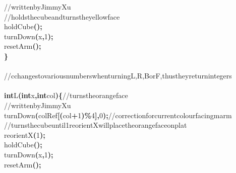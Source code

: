 \documentclass[a4paper, 10pt]{article}
\newcommand\SPC{\hspace*{0.6em}}
\newcommand\TAB{\hspace*{1.2em}}
\newcommand{\CppAComment}[1]{\textcolor[rgb]{0,0.5,0}{\colorbox[rgb]{1,1,1}{#1}}}
\newcommand{\CppAIdentifier}[1]{#1}
\newcommand{\CppANumber}[1]{\textcolor[rgb]{0,0,1}{\colorbox[rgb]{1,1,1}{#1}}}
\newcommand{\CppAReservedWord}[1]{\textbf{\colorbox[rgb]{1,1,1}{#1}}}
\newcommand{\CppASpace}[1]{\colorbox[rgb]{1,1,1}{#1}}
\newcommand{\CppASymbol}[1]{\textbf{\textcolor[rgb]{1,0,0}{\colorbox[rgb]{1,1,1}{#1}}}}
\begin{document}
\begin{ttfamily}
\CppASpace{\TAB }\CppAComment{//\SPC written\SPC by\SPC Jimmy\SPC Xu}\\
\CppASpace{\TAB }\CppAComment{//\SPC holds\SPC the\SPC cube\SPC and\SPC turns\SPC the\SPC yellow\SPC face}\\
\CppASpace{\TAB }\CppAIdentifier{holdCube}\CppASymbol{(}\CppASymbol{)}\CppASymbol{;}\\
\CppASpace{\TAB }\CppAIdentifier{turnDown}\CppASymbol{(}\CppAIdentifier{x}\CppASymbol{,}\CppANumber{1}\CppASymbol{)}\CppASymbol{;}\\
\CppASpace{\TAB }\CppAIdentifier{resetArm}\CppASymbol{(}\CppASymbol{)}\CppASymbol{;}\\
\CppASymbol{\}}\\
\\
\CppAComment{//\SPC c\SPC changes\SPC to\SPC various\SPC numbers\SPC when\SPC turning\SPC L,\SPC R,\SPC B\SPC or\SPC F,\SPC thus\SPC they\SPC return\SPC integers}\\
\\
\CppAReservedWord{int}\CppASpace{\SPC }\CppAIdentifier{L}\CppASymbol{(}\CppAReservedWord{int}\CppASpace{\SPC }\CppAIdentifier{x}\CppASymbol{,}\CppASpace{\SPC }\CppAReservedWord{int}\CppASpace{\SPC }\CppAIdentifier{col}\CppASymbol{)}\CppASymbol{\{}\CppASpace{\SPC }\CppAComment{//\SPC turns\SPC the\SPC orange\SPC face}\\
\CppASpace{\TAB }\CppAComment{//\SPC written\SPC by\SPC Jimmy\SPC Xu}\\
\CppASpace{\TAB }\CppAIdentifier{turnDown}\CppASymbol{(}\CppAIdentifier{colRef}\CppASymbol{[}\CppASymbol{(}\CppAIdentifier{col}\CppASymbol{+}\CppANumber{1}\CppASymbol{)}\CppASymbol{\%}\CppANumber{4}\CppASymbol{]}\CppASymbol{,}\CppANumber{0}\CppASymbol{)}\CppASymbol{;}\CppASpace{\SPC }\CppAComment{//\SPC correction\SPC for\SPC current\SPC colour\SPC facing\SPC marm}\\
\CppASpace{\TAB }\CppAComment{//\SPC turns\SPC the\SPC cube\SPC until\SPC 1\SPC reorientX\SPC will\SPC place\SPC the\SPC orange\SPC face\SPC on\SPC plat}\\
\CppASpace{\TAB }\CppAIdentifier{reorientX}\CppASymbol{(}\CppANumber{1}\CppASymbol{)}\CppASymbol{;}\\
\CppASpace{\TAB }\CppAIdentifier{holdCube}\CppASymbol{(}\CppASymbol{)}\CppASymbol{;}\\
\CppASpace{\TAB }\CppAIdentifier{turnDown}\CppASymbol{(}\CppAIdentifier{x}\CppASymbol{,}\CppANumber{1}\CppASymbol{)}\CppASymbol{;}\\
\CppASpace{\TAB }\CppAIdentifier{resetArm}\CppASymbol{(}\CppASymbol{)}\CppASymbol{;}\\

\end{ttfamily}
\end{document}
